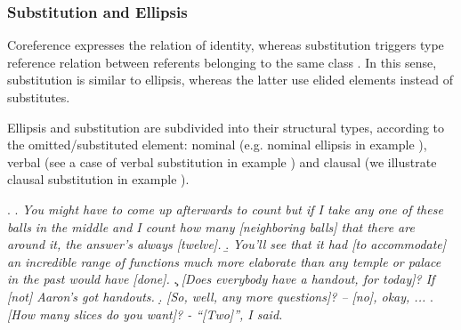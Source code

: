 \documentclass[a4paper]{article}
\begin{document}




\subsubsection{Substitution and Ellipsis}\label{sec:substitution}
Coreference expresses the relation of identity, whereas substitution triggers type reference relation between referents belonging to the same class \cite{KunzSteiner2013,deBeaugrandeDressler1981}. In this sense,
substitution is similar to ellipsis, whereas the latter use elided elements
instead of substitutes.

Ellipsis and substitution are subdivided into their structural types,
according to the omitted/substituted element: nominal (e.g. nominal
ellipsis in example \Next[a]), verbal (see a case of verbal substitution in
example \Next[b]) and clausal (we illustrate clausal substitution in example
\Next[c]).

\ex.
\a. {\sl You might have to come up afterwards to count but if I take
any one of these balls in the middle and I count how many
[neighboring balls] that there are around it, the answer's
always [twelve].}
\b. {\sl You'll see that it had [to accommodate] an incredible range
of functions much more elaborate than any temple or palace in
the past would have [done].}
\c. {\sl [Does everybody have a handout, for today]? If [not]
Aaron's got handouts.}
\d. {\sl [So, well, any more questions]? -- [no], okay, ...}
\e. {\sl [How many slices do you want]? - ``[Two]'', I said.}
\end{document}
